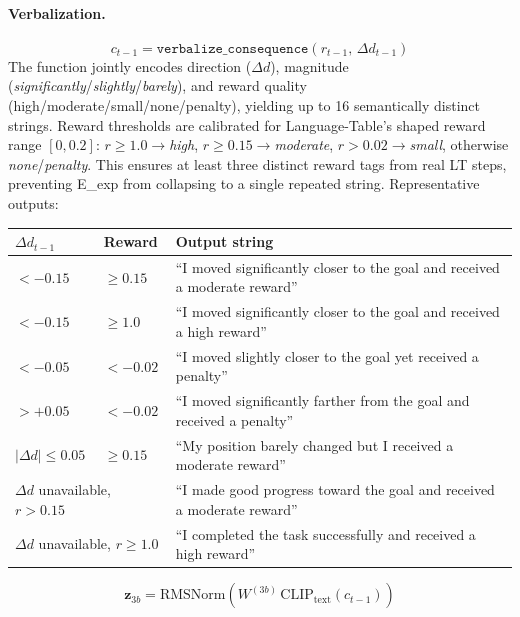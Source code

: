 \documentclass{article}
\renewcommand{\arraystretch}{1.25}
\begin{document}
\paragraph{Verbalization.}
\begin{equation}
  c_{t-1} = \texttt{verbalize\_consequence}(r_{t-1},\,\Delta d_{t-1})
\end{equation}
The function jointly encodes direction ($\Delta d$), magnitude
(\textit{significantly}/\textit{slightly}/\textit{barely}), and reward quality
(high/moderate/small/none/penalty), yielding up to 16 semantically distinct
strings. Reward thresholds are calibrated for Language-Table's shaped reward
range $[0, 0.2]$: $r\!\ge\!1.0\to$\emph{high}, $r\!\ge\!0.15\to$\emph{moderate},
$r\!>\!0.02\to$\emph{small}, otherwise \emph{none}/\emph{penalty}. This ensures
at least three distinct reward tags from real LT steps, preventing E_exp
from collapsing to a single repeated string. Representative outputs:

\vspace{4pt}
\begin{center}
\small
\renewcommand{\arraystretch}{1.15}
\begin{tabular}{lll}
\toprule
$\Delta d_{t-1}$ & Reward & Output string \\
\midrule
$<{-}0.15$ & ${\ge}0.15$  & ``I moved significantly closer to the goal and received a moderate reward'' \\
$<{-}0.15$ & ${\ge}1.0$   & ``I moved significantly closer to the goal and received a high reward'' \\
$<{-}0.05$ & ${<}{-}0.02$ & ``I moved slightly closer to the goal yet received a penalty'' \\
$>{+}0.05$ & ${<}{-}0.02$ & ``I moved significantly farther from the goal and received a penalty'' \\
$|\Delta d|\le0.05$ & ${\ge}0.15$ & ``My position barely changed but I received a moderate reward'' \\
\multicolumn{2}{l}{$\Delta d$ unavailable, $r{>}0.15$} & ``I made good progress toward the goal and received a moderate reward'' \\
\multicolumn{2}{l}{$\Delta d$ unavailable, $r{\ge}1.0$}  & ``I completed the task successfully and received a high reward'' \\
\bottomrule
\end{tabular}
\end{center}
\vspace{4pt}

\begin{equation}
  \mathbf{z}_{3b} = \mathrm{RMSNorm}(W^{(3b)}\,\mathrm{CLIP}_{\mathrm{text}}(c_{t-1}))
  \label{eq:experience_enc}
\end{equation}
\end{document}
